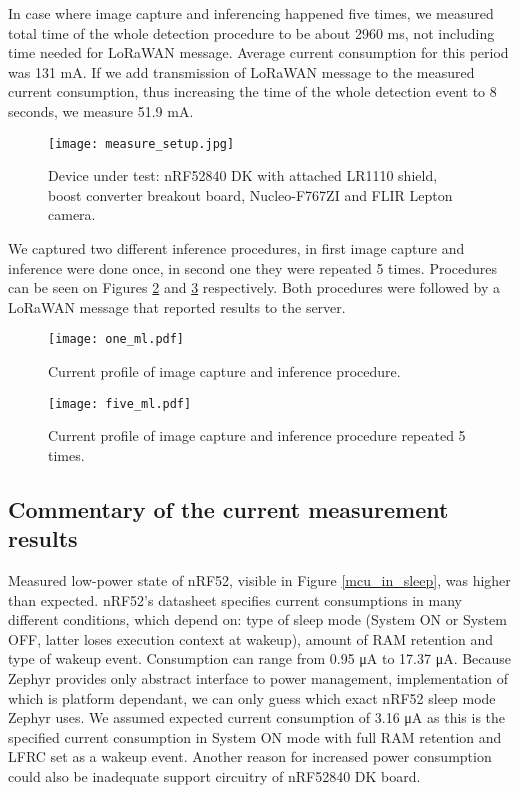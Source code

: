 In case where image capture and inferencing happened five times, we measured total time of the whole detection procedure to be about 2960 \si{\milli\second}, not including time needed for LoRaWAN message.
Average current consumption for this period was 131 \si{\milli\ampere}.
If we add transmission of LoRaWAN message to the measured current consumption, thus increasing the time of the whole detection event to 8 seconds, we measure 51.9 \si{\milli\ampere}.

\begin{figure}[ht]
    \centering
    \texttt{[image: measure\_setup.jpg]}
    \caption{ Device under test: nRF52840 DK with attached LR1110 shield, boost converter breakout board, Nucleo-F767ZI and FLIR Lepton camera.}
    \label{measure_setup}
\end{figure}

We captured two different inference procedures, in first image capture and inference were done once, in second one they were repeated 5 times.
Procedures can be seen on Figures \ref{one_ml} and \ref{five_ml} respectively.
Both procedures were followed by a LoRaWAN message that reported results to the server.

\begin{figure}[ht]
    \centering
    \texttt{[image: one\_ml.pdf]}
    \caption{ Current profile of image capture and inference procedure.}
    \label{one_ml}
\end{figure}
\begin{figure}[ht]
    \centering
    \texttt{[image: five\_ml.pdf]}
    \caption{ Current profile of image capture and inference procedure repeated 5 times.}
    \label{five_ml}
\end{figure}


\subsection{ Commentary of the current measurement results}

Measured low-power state of nRF52, visible in Figure \ref{mcu_in_sleep}, was higher than expected.
nRF52's datasheet\cite{nrf52_datasheet} specifies current consumptions in many different conditions, which depend on: type of sleep mode (System ON or System OFF, latter loses execution context at wakeup), amount of RAM retention and type of wakeup event.
Consumption can range from 0.95 \si{\micro\ampere} to 17.37 \si{\micro\ampere}.
Because Zephyr provides only abstract interface to power management, implementation of which is platform dependant, we can only guess which exact nRF52 sleep mode Zephyr uses.
We assumed expected current consumption of 3.16 \si{\micro\ampere} as this is the specified current consumption in System ON mode with full RAM retention and LFRC set as a wakeup event.
Another reason for increased power consumption could also be inadequate support circuitry of nRF52840 DK board.

